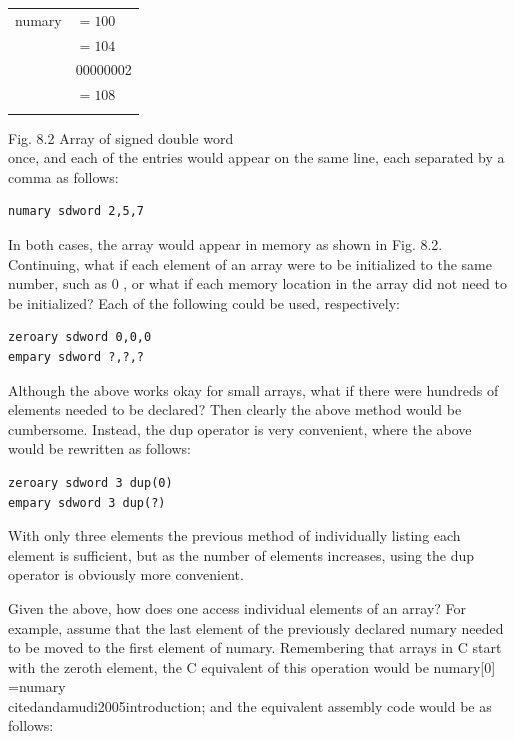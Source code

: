 \documentclass[10pt]{book}
\begin{document}
\begin{center}
\begin{tabular}{rl|}
numary & $=100$ \\
 & $=104$ \\
 & 00000002 \\
 & $=108$ \\
 &  \\
\end{tabular}
\end{center}

Fig. 8.2 Array of signed double word\\
once, and each of the entries would appear on the same line, each separated by a comma as follows:


\begin{verbatim}
numary sdword 2,5,7
\end{verbatim}

In both cases, the array would appear in memory as shown in Fig. 8.2.\\
Continuing, what if each element of an array were to be initialized to the same number, such as 0 , or what if each memory location in the array did not need to be initialized? Each of the following could be used, respectively:

\begin{verbatim}
zeroary sdword 0,0,0
empary sdword ?,?,?
\end{verbatim}

Although the above works okay for small arrays, what if there were hundreds of elements needed to be declared? Then clearly the above method would be cumbersome. Instead, the dup operator is very convenient, where the above would be rewritten as follows:

\begin{verbatim}
zeroary sdword 3 dup(0)
empary sdword 3 dup(?)
\end{verbatim}

With only three elements the previous method of individually listing each element is sufficient, but as the number of elements increases, using the dup operator is obviously more convenient.

Given the above, how does one access individual elements of an array? For example, assume that the last element of the previously declared numary needed to be moved to the first element of numary. Remembering that arrays in C start with the zeroth element, the C equivalent of this operation would be numary[0] =numary\\cite{dandamudi2005introduction}; and the equivalent assembly code would be as follows:
\end{document}
